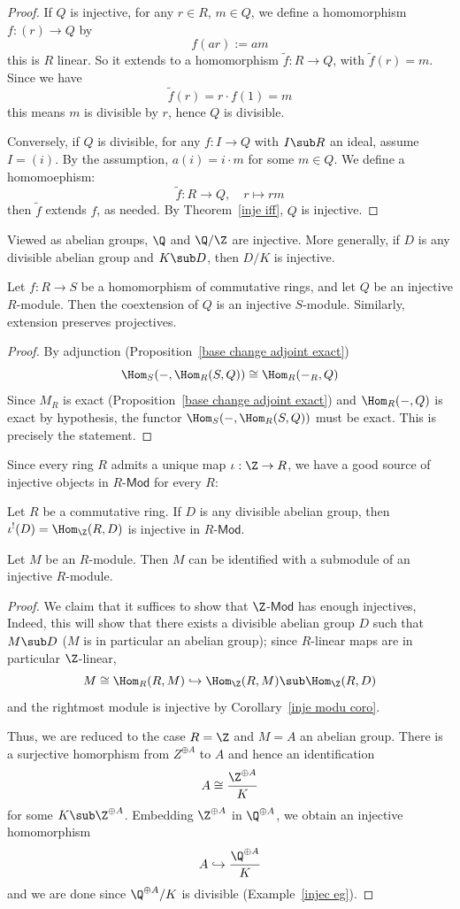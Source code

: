 \begin{proof}
If $Q$ is injective, for any $r\in R$, $m\in Q$, we define a homomorphism $f:(r)\to Q$ by
\[f(ar):=am\]
this is $R$ linear. So it extends to a homomorphism $\widetilde{f}:R\to Q$, with $\widetilde{f}(r)=m$. Since we have
\[\widetilde{f}(r)=r\cdot f(1)=m\]
this means $m$ is divisible by $r$, hence $Q$ is divisible.\par
Conversely, if $Q$ is divisible, for any $f:I\to Q$ with $I\sub R$ an ideal, assume $I=(i)$. By the assumption, $a(i)=i\cdot m$ for some $m\in Q$. We define a homomoephism:
\[\widetilde{f}:R\to Q,\quad r\mapsto rm\]
then $\widetilde{f}$ extends $f$, as needed. By Theorem~\ref{inje iff}, $Q$ is injective.
\end{proof}
\begin{example}\label{injec eg}
Viewed as abelian groups, $\Q$ and $\Q/\Z$ are injective. More generally, if $D$ is any divisible abelian group and $K\sub D$, then $D/K$ is injective.
\end{example}
\begin{lemma}
Let $f:R\to S$ be a homomorphism of commutative rings, and let $Q$ be an injective $R$-module. Then the coextension of $Q$ is an injective $S$-module. Similarly, extension preserves projectives.
\end{lemma}
\begin{proof}
By adjunction (Proposition~\ref{base change adjoint exact})
\[\Hom_S(-,\Hom_R(S,Q))\cong\Hom_R(-{}_R,Q)\]
Since $M_R$ is exact (Proposition~\ref{base change adjoint exact}) and $\Hom_R(-,Q)$ is exact by hypothesis, the functor $\Hom_S(-,\Hom_R(S,Q))$ must be exact. This is precisely the statement.
\end{proof}
Since every ring $R$ admits a unique map $\iota:\Z\to R$, we have a good source of injective objects in $R$-$\mathsf{Mod}$ for every $R$:
\begin{corollary}\label{inje modu coro}
Let $R$ be a commutative ring. If $D$ is any divisible abelian group, then $\iota^!(D)=\Hom_\Z(R,D)$ is injective in $R$-$\mathsf{Mod}$.
\end{corollary}
\begin{corollary}\label{submodu injec}
Let $M$ be an $R$-module. Then $M$ can be identified with a submodule of an injective $R$-module.
\end{corollary}
\begin{proof}
We claim that it suffices to show that $\Z$-$\mathsf{Mod}$ has enough injectives, Indeed, this will show that there exists a divisible abelian group $D$ such that $M\sub D$ ($M$ is in particular an abelian group); since $R$-linear maps are in particular $\Z$-linear,
\[M\cong\Hom_R(R,M)\hookrightarrow\Hom_\Z(R,M)\sub\Hom_\Z(R,D)\]
and the rightmost module is injective by Corollary~\ref{inje modu coro}.\par
Thus, we are reduced to the case $R=\Z$ and $M=A$ an abelian group. There is a surjective homorphism from $Z^{\oplus A}$ to $A$ and hence an identification
\[A\cong\dfrac{\Z^{\oplus A}}{K}\]
for some $K\sub\Z^{\oplus A}$. Embedding $\Z^{\oplus A}$ in $\Q^{\oplus A}$, we obtain an injective homomorphism
\[A\hookrightarrow\dfrac{\Q^{\oplus A}}{K}\]
and we are done since $\Q^{\oplus A}/K$ is divisible (Example~\ref{injec eg}).
\end{proof}
